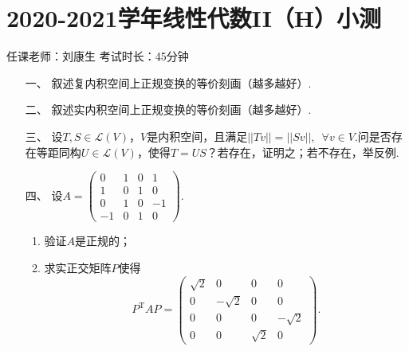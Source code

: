 \section*{2020-2021学年线性代数II（H）小测}

\begin{center}
    任课老师：刘康生\hspace{4em} 考试时长：45分钟
\end{center}

\begin{enumerate}
	\item[一、]叙述复内积空间上正规变换的等价刻画（越多越好）.
	\item[二、]叙述实内积空间上正规变换的等价刻画（越多越好）.
	\item[三、]设$T,S\in\mathcal{L}(V)$，$V$是内积空间，且满足$||Tv||=||Sv||,\enspace \forall v\in V$.问是否存在等距同构$U\in\mathcal{L}(V)$，使得$T=US$？若存在，证明之；若不存在，举反例.
	\item[四、]设$A=\begin{pmatrix}
        0 & 1 & 0 & 1 \\ 1 & 0 & 1 & 0 \\ 0 & 1 & 0 & -1 \\ -1 & 0 & 1 & 0
    \end{pmatrix}$.
    \begin{enumerate}[label=(\arabic*)]
        \item 验证$A$是正规的；
        \item 求实正交矩阵$P$使得
        \[P^{\mathrm{T}}AP=\begin{pmatrix}
            \sqrt{2} & 0 & 0 & 0 \\ 0 & -\sqrt{2} & 0 & 0 \\ 0 & 0 & 0 & -\sqrt{2} \\ 0 & 0 & \sqrt{2} & 0
        \end{pmatrix}.\]
    \end{enumerate}
\end{enumerate}

\clearpage
